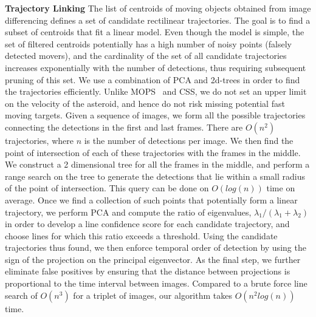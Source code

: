 \documentclass{article}
\begin{document}
{\bf Trajectory Linking}
The list of centroids of moving objects obtained from image differencing defines a set of candidate rectilinear trajectories.  The goal is to find a subset of centroids that fit a linear model. Even though the model is simple, the set of filtered centroids potentially has a high number of noisy points (falsely detected movers), and the cardinality of the set of all candidate trajectories increases exponentially with the number of detections, thus requiring subsequent pruning of this set. We use a combination of PCA and 2d-trees in order to find the trajectories efficiently. Unlike MOPS~\cite{denneau2013pan} and CSS\cite{css2014}, we do not set an upper limit on the velocity of the asteroid, and hence do not risk missing potential fast moving targets. Given a sequence of images, we form all the possible trajectories connecting the detections in the first and last frames. There are $O(n^2)$ trajectories, where $n$ is the number of detections per image. We then find the point of intersection of each of these trajectories with the frames in the middle. We construct a 2 dimensional tree for all the frames in the middle, and perform a range search on the tree to generate the detections that lie within a small radius of the point of intersection. This query can be done on $O(log(n))$ time on average. Once we find a collection of such points that potentially form a linear trajectory, we perform PCA and compute the ratio of eigenvalues, $\lambda_{1}/(\lambda_{1}+ \lambda_{2})$ in order to develop a line confidence score for each candidate trajectory, and choose lines for which this ratio exceeds a threshold. Using the candidate trajectories thus found, we then enforce temporal order of detection by using the sign of the projection on the principal eigenvector.  As the final step, we further eliminate false positives by ensuring that the distance between projections is proportional to the time interval between images. Compared to a brute force line search of $O(n^3)$ for a triplet of images, our algorithm takes $O(n^2log(n))$ time.


\end{document}
